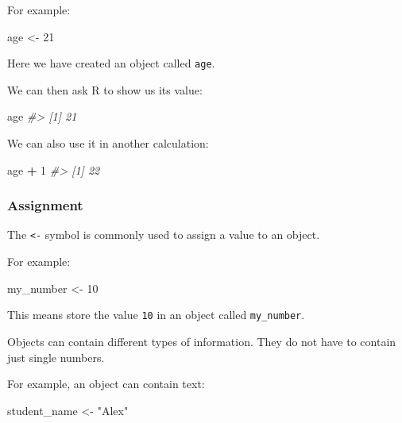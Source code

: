 \documentclass[
]{book}
\newenvironment{Shaded}{\begin{snugshade}}{\end{snugshade}}
\newcommand{\CommentTok}[1]{\textcolor[rgb]{0.56,0.35,0.01}{\textit{#1}}}
\newcommand{\DecValTok}[1]{\textcolor[rgb]{0.00,0.00,0.81}{#1}}
\newcommand{\NormalTok}[1]{#1}
\newcommand{\OtherTok}[1]{\textcolor[rgb]{0.56,0.35,0.01}{#1}}
\newcommand{\SpecialCharTok}[1]{\textcolor[rgb]{0.81,0.36,0.00}{\textbf{#1}}}
\newcommand{\StringTok}[1]{\textcolor[rgb]{0.31,0.60,0.02}{#1}}
\begin{document}
For example:

\begin{Shaded}
\begin{Highlighting}[]
\NormalTok{age }\OtherTok{\textless{}{-}} \DecValTok{21}
\end{Highlighting}
\end{Shaded}

Here we have created an object called \texttt{age}.

We can then ask R to show us its value:

\begin{Shaded}
\begin{Highlighting}[]
\NormalTok{age}
\CommentTok{\#\textgreater{} [1] 21}
\end{Highlighting}
\end{Shaded}

We can also use it in another calculation:

\begin{Shaded}
\begin{Highlighting}[]
\NormalTok{age }\SpecialCharTok{+} \DecValTok{1}
\CommentTok{\#\textgreater{} [1] 22}
\end{Highlighting}
\end{Shaded}

\subsubsection{Assignment}\label{assignment}

The \texttt{\textless{}-} symbol is commonly used to assign a value to an object.

For example:

\begin{Shaded}
\begin{Highlighting}[]
\NormalTok{my\_number }\OtherTok{\textless{}{-}} \DecValTok{10}
\end{Highlighting}
\end{Shaded}

This means store the value \texttt{10} in an object called \texttt{my\_number}.

Objects can contain different types of information. They do not have to contain just single numbers.

For example, an object can contain text:

\begin{Shaded}
\begin{Highlighting}[]
\NormalTok{student\_name }\OtherTok{\textless{}{-}} \StringTok{"Alex"}
\end{Highlighting}
\end{Shaded}
\end{document}
